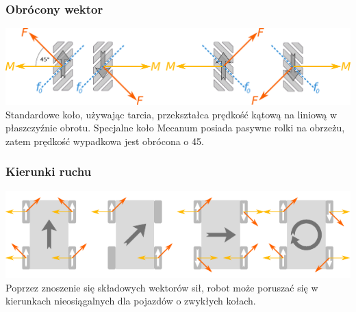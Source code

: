 \documentclass{beamer}
\begin{document}
	\begin{frame}
		\frametitle{Obrócony wektor}
		\centering
		\includegraphics[width=\textwidth]{graphics/vectors.pdf} \\
		Standardowe koło, używając tarcia, przekształca prędkość kątową na liniową w płaszczyźnie obrotu.
		Specjalne koło Mecanum posiada pasywne rolki na obrzeżu, zatem prędkość wypadkowa jest obrócona o 45\textdegree.
	\end{frame}
	
	\begin{frame}
		\frametitle{Kierunki ruchu}
		\centering
		\includegraphics[width=\textwidth]{graphics/dirs.pdf} \\
		Poprzez znoszenie się składowych wektorów sił, robot może poruszać się w kierunkach nieosiągalnych dla pojazdów o zwykłych kołach.
	\end{frame}
	
\end{document}
